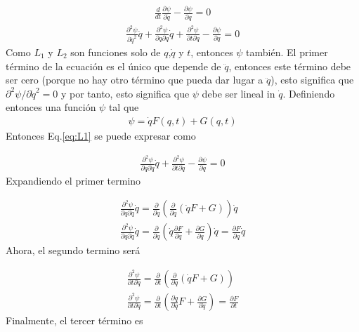 \begin{gather*}
    \frac{d}{dt}\frac{\partial \psi}{\partial \dot{q}} - \frac{\partial \psi}{\partial q} = 0
\end{gather*}
\begin{gather}
    \label{eq:L1}\frac{\partial ^2\psi}{\partial \dot{q}^2}\ddot{q} + \frac{\partial ^2 \psi}{\partial q\partial \dot{q}}\dot{q} + \frac{\partial ^2 \psi}{\partial t\partial \dot{q}} - \frac{\partial \psi}{\partial q} = 0
\end{gather}
Como $L_1$ y $L_2$ son funciones solo de $q$,$\dot{q}$ y $t$, entonces $\psi$ también. El primer término de la ecuación es el único que depende de $\ddot{q}$, entonces este término debe ser cero (porque no hay otro término que pueda dar lugar a $\ddot{q}$), esto significa que $\partial^2 \psi /\partial \dot{q}^2 = 0$ y por tanto, esto significa que $\psi$ debe ser lineal in $\dot{q}$. Definiendo entonces una función $\psi$ tal que
\begin{gather*}
    \psi  = \dot{q}F(q,t) + G(q,t)
\end{gather*}
Entonces Eq.\ref*{eq:L1} se puede expresar como 

\begin{gather*}
    \frac{\partial ^2 \psi}{\partial q\partial \dot{q}}\dot{q} + \frac{\partial ^2 \psi}{\partial t\partial \dot{q}} - \frac{\partial \psi}{\partial q} = 0
\end{gather*}
Expandiendo el primer termino 

\begin{gather*}
    \frac{\partial^2 \psi}{\partial q\partial \dot{q}}\dot{q} =     \frac{\partial}{\partial \dot{q}}\left(\frac{\partial }{\partial q}(\dot{q}F + G)\right)\dot{q}\\
    \frac{\partial^2 \psi}{\partial q\partial \dot{q}}\dot{q} =     \frac{\partial}{\partial \dot{q}}\left(\dot{q}\frac{\partial F}{\partial q} + \frac{\partial G}{\partial q}\right)\dot{q} = \frac{\partial F}{\partial q}\dot{q}
\end{gather*}
Ahora, el segundo termino será

\begin{gather*}
    \frac{\partial ^2 \psi}{\partial t\partial \dot{q}} =      \frac{\partial}{\partial t}\left(\frac{\partial }{\partial \dot{q}}(\dot{q}F + G)\right)\\
    \frac{\partial ^2 \psi}{\partial t\partial \dot{q}} =      \frac{\partial}{\partial t}\left(\frac{\partial \dot{q}}{\partial \dot{q}}F + \frac{\partial G}{\partial \dot{q}}\right) =  \frac{\partial F}{\partial t} 
\end{gather*}
Finalmente, el tercer término es 


